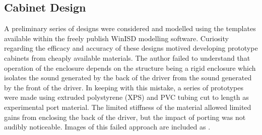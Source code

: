 \subsection{Cabinet Design}
A preliminary series of designs were considered and modelled using the templates available within the freely publish WinISD modelling software. Curiosity regarding the efficacy and accuracy of these designs motived developing prototype cabinets from cheaply available materials. The author failed to understand that operation of the enclosure depends on the structure being a rigid enclosure which isolates the sound generated by the back of the driver from the sound generated by the front of the driver. In keeping with this mistake, a series of prototypes were made using extruded polystyrene (XPS) and PVC tubing cut to length as experimental port material. The limited stiffness of the material allowed limited gains from enclosing the back of the driver, but the impact of porting was not audibly noticeable. Images of this failed approach are included as .\par 
%
